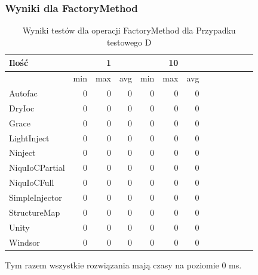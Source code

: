 \documentclass[12pt]{article}
\begin{document}
\subsubsection{Wyniki dla FactoryMethod}
\begin{table}[H]
\captionsetup{belowskip=0pt,aboveskip=0pt}
\begin{center}
\begin{small}
	\begin{tabular}{ | l | r r r | r r r | r r r | r r r | }
    		\hline
Ilość & & 1 & & & 10 & \\ \hline
 & min & max & avg & min & max & avg \\ \hline
Autofac & 0 & 0 & 0 & 0 & 0 & 0 \\ \hline
DryIoc & 0 & 0 & 0 & 0 & 0 & 0 \\ \hline
Grace & 0 & 0 & 0 & 0 & 0 & 0 \\ \hline
LightInject & 0 & 0 & 0 & 0 & 0 & 0 \\ \hline
Ninject & 0 & 0 & 0 & 0 & 0 & 0 \\ \hline
NiquIoCPartial & 0 & 0 & 0 & 0 & 0 & 0 \\ \hline
NiquIoCFull & 0 & 0 & 0 & 0 & 0 & 0 \\ \hline
SimpleInjector & 0 & 0 & 0 & 0 & 0 & 0 \\ \hline
StructureMap & 0 & 0 & 0 & 0 & 0 & 0 \\ \hline
Unity & 0 & 0 & 0 & 0 & 0 & 0 \\ \hline
Windsor & 0 & 0 & 0 & 0 & 0 & 0 \\ \hline
  	\end{tabular}
\end{small}
\end{center}
\caption{Wyniki testów dla operacji FactoryMethod dla Przypadku testowego D}
\label{TestCaseD_FactoryMethod}
\end{table}
Tym razem wszystkie rozwiązania mają czasy na poziomie 0 ms.



\clearpage
\end{document}
